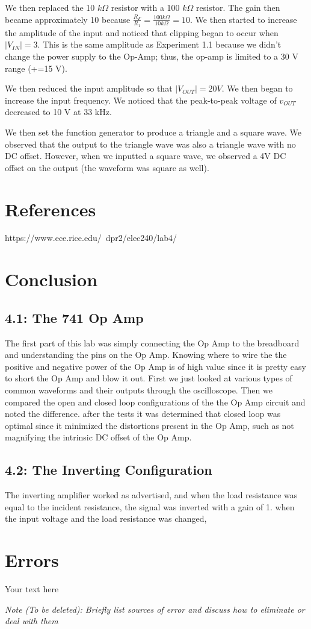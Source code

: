 \documentclass[10pt]{article}
\begin{document}
We then replaced the 10 $k\Omega$ resistor with a 100 $k\Omega$ resistor. The gain then became approximately 10 because $\frac{R_F}{R_1} = \frac{100k\Omega}{10k\Omega} = 10$. We then started to increase the amplitude of the input and noticed that clipping began to occur when $|V_{IN}| = 3$. This is the same amplitude as Experiment 1.1 because we didn't change the power supply to the Op-Amp; thus, the op-amp is limited to a 30 V range (+=15 V).

We then reduced the input amplitude so that $|V_{OUT}| = 20V$. We then began to increase the input frequency. We noticed that the peak-to-peak voltage of $v_{OUT}$ decreased to 10 V at 33 kHz. 

\quad We then set the function generator to produce a triangle and a square wave. We observed that the output to the triangle wave was also a triangle wave with no DC offset. However, when we inputted a square wave, we observed a 4V DC offset on the output (the waveform was square as well). 


\section{References}

https://www.ece.rice.edu/~dpr2/elec240/lab4/

\section{Conclusion}

\subsection{4.1: The 741 Op Amp}
The first part of this lab was simply connecting the Op Amp to the breadboard and understanding the pins on the Op Amp. Knowing where to wire the the positive and negative power of the Op Amp is of high value since it is pretty easy to short the Op Amp and blow it out. First we just looked at various types of common waveforms and their outputs through the oscilloscope. Then we compared the open and closed loop configurations of the the Op Amp circuit and noted the difference. after the tests it was determined that closed loop was optimal since it minimized the distortions present in the Op Amp, such as not magnifying the intrinsic DC offset of the Op Amp.

\subsection{4.2: The Inverting Configuration}
The inverting amplifier worked as advertised, and when the load resistance was equal to the incident resistance, the signal was inverted with a gain of 1. when the input voltage and the load resistance was changed, 

\section{Errors}

Your text here

\medskip

\textit{Note (To be deleted): Briefly list sources of error and discuss how to eliminate or deal with them}
\end{document}
